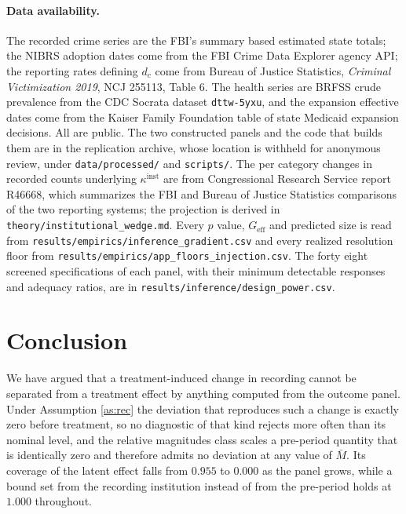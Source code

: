 \documentclass[12pt]{article}
\theoremstyle{definition}
\numberwithin{equation}{section}
\begin{document}
\paragraph{Data availability.} The recorded crime series are the FBI's
summary based estimated state totals; the NIBRS adoption dates come from the FBI
Crime Data Explorer agency API; the reporting rates defining $d_c$ come from
Bureau of Justice Statistics, \emph{Criminal Victimization 2019}, NCJ 255113,
Table 6. The health series are BRFSS crude prevalence from the CDC Socrata
dataset \texttt{dttw-5yxu}, and the expansion effective dates come from the
Kaiser Family Foundation table of state Medicaid expansion decisions. All are
public. The two constructed panels and the code that builds them are in the
replication archive, whose location is withheld for anonymous review, under
\texttt{data/processed/} and \texttt{scripts/}. The per category changes in
recorded counts underlying $\kappa^{\mathrm{inst}}$ are from Congressional
Research Service report R46668, which summarizes the FBI and Bureau of Justice
Statistics comparisons of the two reporting systems; the projection is derived
in \texttt{theory/institutional\_wedge.md}. Every $p$ value,
$G_{\mathrm{eff}}$ and predicted size is read from
\texttt{results/empirics/inference\_gradient.csv} and every realized resolution
floor from \texttt{results/empirics/app\_floors\_injection.csv}. The forty
eight screened specifications of each panel, with their minimum detectable
responses and adequacy ratios, are in
\texttt{results/inference/design\_power.csv}.

\section{Conclusion}

We have argued that a treatment-induced change in recording cannot be separated
from a treatment effect by anything computed from the outcome panel. Under
Assumption \ref{as:rec} the deviation that reproduces such a change is exactly
zero before treatment, so no diagnostic of that kind rejects more often than its
nominal level, and the relative magnitudes class scales a pre-period quantity
that is identically zero and therefore admits no deviation at any value of
$\bar M$. Its coverage of the latent effect falls from $0.955$ to $0.000$ as the panel
grows, while a bound set from the recording institution instead of from the pre-period holds at $1.000$ throughout.
\end{document}
